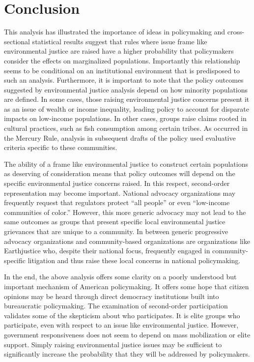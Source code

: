 \section{Conclusion}
This analysis has illustrated the importance of ideas in policymaking and cross-sectional statistical results suggest that rules where issue frame like environmental justice are raised have a higher probability that policymakers consider the effects on marginalized populations. Importantly this relationship seems to be conditional on an institutional environment that is predisposed to such an analysis. Furthermore, it is important to note that the policy outcomes suggested by environmental justice analysis depend on how minority populations are defined. In some cases, those raising environmental justice concerns present it as an issue of wealth or income inequality, leading policy to account for disparate impacts on low-income populations. In other cases, groups raise claims rooted in cultural practices, such as fish consumption among certain tribes. As occurred in the Mercury Rule, analysis in subsequent drafts of the policy used evaluative criteria specific to these communities. 

The ability of a frame like environmental justice to construct certain populations as deserving of consideration means that policy outcomes will depend on the specific environmental justice concerns raised. In this respect, second-order representation may become important. National  advocacy organizations may frequently request that regulators protect ``all people'' or even ``low-income communities of color.'' However, this more generic advocacy may not lead to the same outcomes as groups that present specific local environmental justice grievances that are unique to a community. In between generic progressive advocacy organizations and community-based organizations are organizations like Earthjustice who, despite their national focus, frequently engaged in community-specific litigation and thus raise these local concerns in national policymaking. 

In the end, the above analysis offers some clarity on a poorly understood but important mechanism of American policymaking. It offers some hope that citizen opinions may be heard through direct democracy institutions built into bureaucratic policymaking.  The examination of second-order participation validates some of the skepticism about who participates. It is elite groups who participate, even with respect to an issue like environmental justice. However, government responsiveness does not seem to depend on mass mobilization or elite support. Simply raising environmental justice issues may be sufficient to significantly increase the probability that they will be addressed by policymakers. 